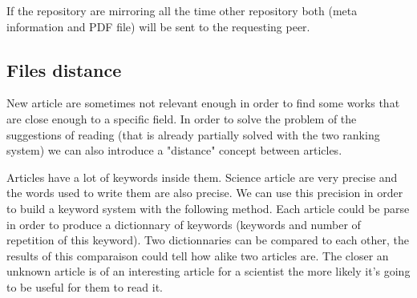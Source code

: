 If the repository are mirroring all the time other repository both (meta information and
PDF file) will be sent to the requesting peer.

\subsection{Files distance}

New article are sometimes not relevant enough in order to find some works that are
close enough to a specific field. In order to solve the problem of the suggestions of
reading (that is already partially solved with the two ranking system) we can also
introduce a "distance" concept between articles.

Articles have a lot of keywords inside them. Science article are very precise and 
the words used to write them are also precise. We can use this precision in order to build a 
keyword system with the following method. Each article could be parse in order to produce 
a dictionnary of keywords (keywords and number of repetition of this keyword). Two 
dictionnaries can be compared to each other, the results of this comparaison could tell
how alike two articles are. The closer an unknown article is of an interesting article for a scientist
the more likely it's going to be useful for them to read it.
